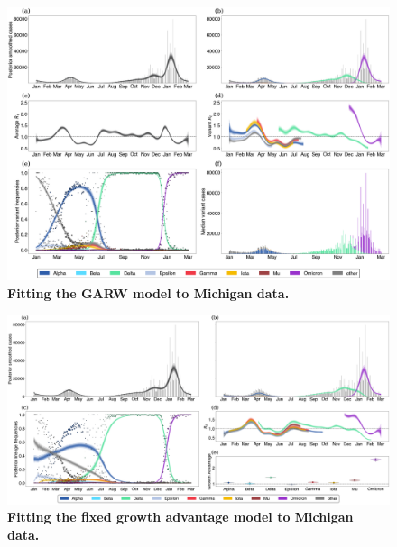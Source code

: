 \begin{figure}
  \centering
  \includegraphics[width=\linewidth]{figs/GARW_rt_Michigan.png}
  \caption{\textbf{Fitting the GARW model to Michigan data.}}%
  \label{fig:GARW_rt_Michigan}
\end{figure}

\begin{figure}
  \centering
  \includegraphics[width=\linewidth]{figs/fixed_growth_Michigan.png}
  \caption{\textbf{Fitting the fixed growth advantage model to Michigan data.}}%
  \label{fig:fixed_growth_Michigan}
\end{figure}

